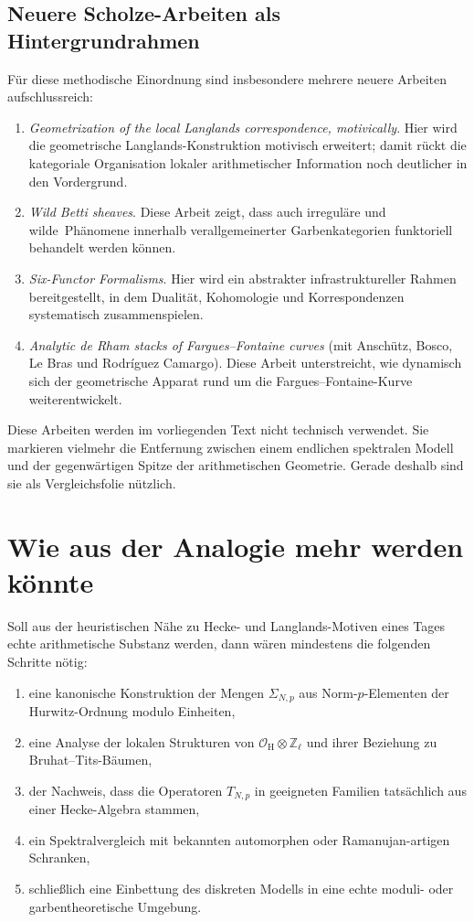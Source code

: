 \documentclass[12pt,a4paper]{article}
\theoremstyle{plain}
\theoremstyle{definition}
\theoremstyle{remark}
\newcommand{\Z}{\mathbb{Z}}
\newcommand{\OH}{\mathcal{O}_{\mathrm H}}
\newcommand{\SNp}{\Sigma_{N,p}}
\newcommand{\TNp}{T_{N,p}}
\begin{document}
\subsection*{Neuere Scholze-Arbeiten als Hintergrundrahmen}
Für diese methodische Einordnung sind insbesondere mehrere neuere Arbeiten aufschlussreich:
\begin{enumerate}[label=\arabic*.]
\item \emph{Geometrization of the local Langlands correspondence, motivically}. Hier wird die geometrische Langlands-Konstruktion motivisch erweitert; damit rückt die kategoriale Organisation lokaler arithmetischer Information noch deutlicher in den Vordergrund.
\item \emph{Wild Betti sheaves}. Diese Arbeit zeigt, dass auch irreguläre und \glqq wilde\grqq\ Phänomene innerhalb verallgemeinerter Garbenkategorien funktoriell behandelt werden können.
\item \emph{Six-Functor Formalisms}. Hier wird ein abstrakter infrastruktureller Rahmen bereitgestellt, in dem Dualität, Kohomologie und Korrespondenzen systematisch zusammenspielen.
\item \emph{Analytic de Rham stacks of Fargues--Fontaine curves} (mit Anschütz, Bosco, Le Bras und Rodríguez Camargo). Diese Arbeit unterstreicht, wie dynamisch sich der geometrische Apparat rund um die Fargues--Fontaine-Kurve weiterentwickelt.
\end{enumerate}

Diese Arbeiten werden im vorliegenden Text nicht technisch verwendet. Sie markieren vielmehr die Entfernung zwischen einem endlichen spektralen Modell und der gegenwärtigen Spitze der arithmetischen Geometrie. Gerade deshalb sind sie als Vergleichsfolie nützlich.

\section{Wie aus der Analogie mehr werden könnte}
Soll aus der heuristischen Nähe zu Hecke- und Langlands-Motiven eines Tages echte arithmetische Substanz werden, dann wären mindestens die folgenden Schritte nötig:
\begin{enumerate}[label=\arabic*.]
\item eine kanonische Konstruktion der Mengen \(\SNp\) aus Norm-\(p\)-Elementen der Hurwitz-Ordnung modulo Einheiten,
\item eine Analyse der lokalen Strukturen von \(\OH\otimes \Z_\ell\) und ihrer Beziehung zu Bruhat--Tits-Bäumen,
\item der Nachweis, dass die Operatoren \(\TNp\) in geeigneten Familien tatsächlich aus einer Hecke-Algebra stammen,
\item ein Spektralvergleich mit bekannten automorphen oder Ramanujan-artigen Schranken,
\item schließlich eine Einbettung des diskreten Modells in eine echte moduli- oder garbentheoretische Umgebung.
\end{enumerate}
\end{document}

